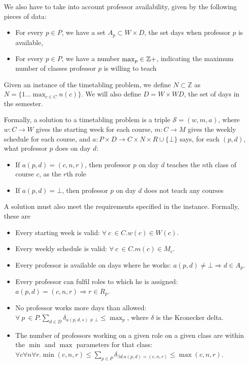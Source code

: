 We also have to take into account professor availability, given by the following pieces of data:
\begin{itemize}
\item For every $p \in P$, we have a set $A_p \subset W \times D$, the set days when professor $p$ is available,
\item For every $p \in P$, we have a number $\max_p \in \mathbb{Z}+$, indicating the maximum number of classes professor $p$ is willing to teach
\end{itemize}

Given an instance of the timetabling problem, we define $N \subset \mathbb{Z}$ as $N = \{1 \dots \max_{c \in C} n(c)\}$. We will also define $D = W \times WD$, the set of days in the semester.

Formally, a solution to a timetabling problem is a triple $\mathcal{S} = (w, m, a)$, where $w: C \to W$ gives the starting week for each course, $m: C \to M$ gives the weekly schedule for each course, and $a: P \times D \to C \times N \times R \cup \{\bot\}$ says, for each $(p, d)$, what professor $p$ does on day $d$:
\begin{itemize}
\item If $a(p, d) = (c, n, r)$, then professor $p$ on day $d$ teaches the $n$th class of course $c$, as the $r$th role
\item If $a(p, d) = \bot$, then professor $p$ on day $d$ does not teach any courses
\end{itemize}

A solution must also meet the requirements specified in the instance. Formally, these are

\begin{itemize}
\item Every starting week is valid: $\forall\ c\ \in C. w(c) \in W(c)$.
\item Every weekly schedule is valid: $\forall\ c\ \in C. m(c) \in M_c$.
\item Every professor is available on days where he works: $a(p, d) \ne \bot \Rightarrow d \in A_p$.
\item Every professor can fulfil roles to which he is assigned: $a(p, d) = (c, n, r) \Rightarrow r \in R_p$.
\item No professor works more days than allowed: $\forall\ p\ \in P. \sum_{d \in D} \delta_{a(p, d, s) \ne \bot} \le \max_p$, where $\delta$ is the Kronecker delta.
\item The number of professors working on a given role on a given class are within the $\min$ and $\max$ parameters for that class: $\forall c \forall n \forall r. \min(c, n, r) \le \sum_{p \in P} \delta_{\exists d. a(p, d) = (c, n, r)} \le \max(c, n, r)$.
\end{itemize}

